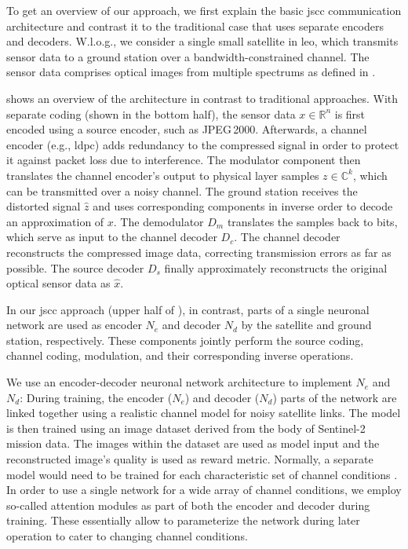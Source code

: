 \documentclass[conference]{IEEEtran}
\newcommand\jpegtwok{JPEG\,2000\xspace}
\newcommand\sentinelii{Sentinel-2\xspace}
\begin{document}
To get an overview of our approach, we first explain the basic \ac{jscc} communication architecture and contrast it to the traditional case that uses separate encoders and decoders.
W.l.o.g., we consider a single small satellite in \ac{leo}, which transmits sensor data to a ground station over a bandwidth-constrained channel.
The sensor data comprises optical images from multiple spectrums as defined in .

 shows an overview of the architecture in contrast to traditional approaches.
With separate coding (shown in the bottom half), the sensor data $x \in \mathbb{R}^n$ is first encoded using a source encoder, such as \jpegtwok.
Afterwards, a channel encoder (e.g., \ac{ldpc}) adds redundancy to the compressed signal in order to protect it against packet loss due to interference.
The modulator component then translates the channel encoder's output to physical layer samples $z \in \mathbb{C}^k$, which can be transmitted over a noisy channel.
The ground station receives the distorted signal $\hat{z}$ and uses corresponding components in inverse order to decode an approximation of $x$.
The demodulator $D_m$ translates the samples back to bits, which serve as input to the channel decoder $D_c$.
The channel decoder reconstructs the compressed image data, correcting transmission errors as far as possible.
The source decoder $D_s$ finally approximately reconstructs the original optical sensor data as $\hat{x}$.

In our \ac{jscc} approach (upper half of ), in contrast, parts of a single neuronal network are used as encoder $N_e$ and decoder $N_d$ by the satellite and ground station, respectively.
These components jointly perform the source coding, channel coding, modulation, and their corresponding inverse operations.

We use an encoder-decoder neuronal network architecture to implement $N_e$ and $N_d$:
During training, the encoder ($N_e$) and decoder ($N_d$) parts of the network are linked together using a realistic channel model for noisy satellite links.
The model is then trained using an image dataset derived from the body of \sentinelii mission data.
The images within the dataset are used as model input and the reconstructed image's quality is used as reward metric.
Normally, a separate model would need to be trained for each characteristic set of channel conditions \cite{satjscc}.
In order to use a single network for a wide array of channel conditions, we employ so-called attention modules as part of both the encoder and decoder during training.
These essentially allow to parameterize the network during later operation to cater to changing channel conditions.
\end{document}
